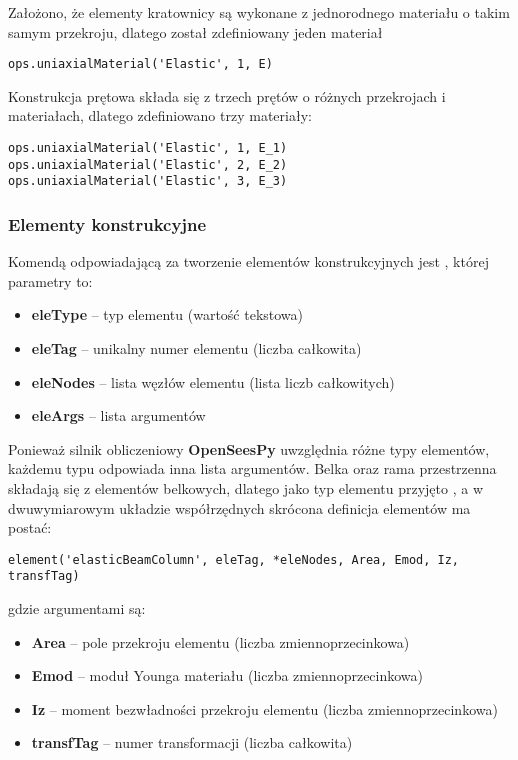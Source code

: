 Założono, że elementy kratownicy są wykonane z jednorodnego materiału o takim samym przekroju, dlatego został zdefiniowany jeden materiał

\begin{lstlisting}
ops.uniaxialMaterial('Elastic', 1, E)
\end{lstlisting}

Konstrukcja prętowa składa się z trzech prętów o różnych przekrojach i materiałach, dlatego zdefiniowano trzy materiały:

\begin{lstlisting}
ops.uniaxialMaterial('Elastic', 1, E_1)
ops.uniaxialMaterial('Elastic', 2, E_2)
ops.uniaxialMaterial('Elastic', 3, E_3)
\end{lstlisting}

\subsubsection*{Elementy konstrukcyjne}

Komendą odpowiadającą za tworzenie elementów konstrukcyjnych jest , której parametry to:

\begin{itemize}
    \item \textbf{eleType} – typ elementu (wartość tekstowa)
    \item \textbf{eleTag} – unikalny numer elementu (liczba całkowita)
    \item \textbf{eleNodes} – lista węzłów elementu (lista liczb całkowitych)
    \item \textbf{eleArgs} – lista argumentów
\end{itemize}

Ponieważ silnik obliczeniowy \textbf{OpenSeesPy} uwzględnia różne typy elementów, każdemu typu odpowiada inna lista argumentów.
Belka oraz rama przestrzenna składają się z elementów belkowych, dlatego jako typ elementu przyjęto , a
w dwuwymiarowym układzie współrzędnych skrócona definicja elementów ma postać:

\begin{lstlisting}
element('elasticBeamColumn', eleTag, *eleNodes, Area, Emod, Iz, transfTag)
\end{lstlisting}

gdzie argumentami są:
\begin{itemize}
    \item \textbf{Area} – pole przekroju elementu (liczba zmiennoprzecinkowa)
    \item \textbf{Emod} – moduł Younga materiału (liczba zmiennoprzecinkowa)
    \item \textbf{Iz} – moment bezwładności przekroju elementu (liczba zmiennoprzecinkowa)
    \item \textbf{transfTag} – numer transformacji (liczba całkowita)
\end{itemize}

